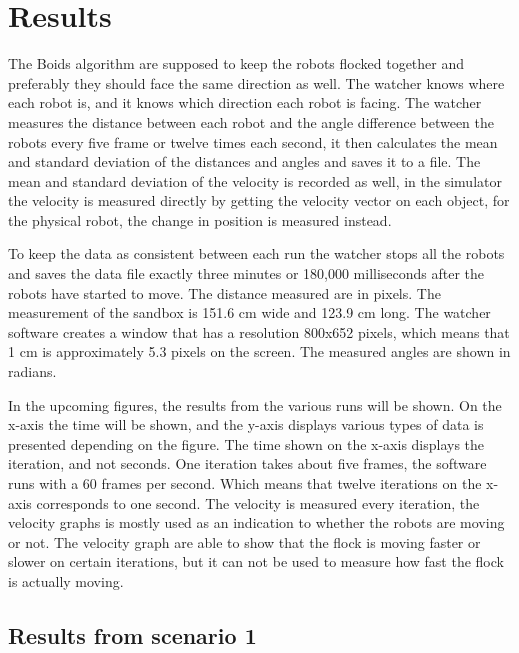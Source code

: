 

\section{Results}
\label{sec:results}

The Boids algorithm are supposed to keep the robots flocked together and preferably they should face the same direction as well. The watcher knows where each robot is, and it knows which direction each robot is facing. The watcher measures the distance between each robot and the angle difference between the robots every five frame or twelve times each second, it then calculates the mean and standard deviation of the distances and angles and saves it to a file. The mean and standard deviation of the velocity is recorded as well, in the simulator the velocity is measured directly by getting the velocity vector on each object, for the physical robot, the change in position is measured instead.

To keep the data as consistent between each run the watcher stops all the robots and saves the data file exactly three minutes or 180,000 milliseconds after the robots have started to move.
The distance measured are in pixels. The measurement of the sandbox is 151.6 cm wide and 123.9 cm long. The watcher software creates a window that has a resolution 800x652 pixels, which means that 1 cm is approximately 5.3 pixels on the screen. The measured angles are shown in radians.

In the upcoming figures, the results from the various runs will be shown. On the x-axis the time will be shown, and the y-axis displays various types of data is presented depending on the figure. The time shown on the x-axis displays the iteration, and not seconds. One iteration takes about five frames, the software runs with a 60 frames per second. Which means that twelve iterations on the x-axis corresponds to one second. The velocity is measured every iteration, the velocity graphs is mostly used as an indication to whether the robots are moving or not. The velocity graph are able to show that the flock is moving faster or slower on certain iterations, but it can not be used to measure how fast the flock is actually moving.

\subsection{Results from scenario 1}
\label{sec:res1}

